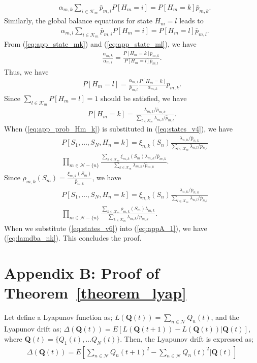 \documentclass[conference]{IEEEtran}
\newcommand{\Kset}{\mathcal{K}}
\newcommand{\Nset}{\mathcal{N}}
\begin{document}
\begin{align} \label{eq:app_state_mk}
& \alpha_{m,k} \sum_{i \in \Kset_{m}} \bar{p}_{m,i} P[H_m=i] = P[H_m=k] \bar{p}_{m,k}.  
\end{align} Similarly, the global balance equations for state $H_m=l$ leads to 
\begin{align} \label{eq:app_state_ml}
& \alpha_{m,l} \sum_{i \in \Kset_{m}} \bar{p}_{m,i} P[H_m=i] = P[H_m=l] \bar{p}_{m,l}.  
\end{align} From (\ref{eq:app_state_mk}) and (\ref{eq:app_state_ml}), we have 
\begin{align}
\frac{\alpha_{m,k}}{\alpha_{m,l}} = \frac{P[H_m=k]\bar{p}_{m,k}}{P[H_m=l]\bar{p}_{m,l}}.
\end{align} Thus, we have 
\begin{align}
P[H_m=l] = \frac{\alpha_{m,l}}{\bar{p}_{m,l}} \frac{P[H_m=k]}{\alpha_{m,k}} \bar{p}_{m,k}. 
\end{align} Since $\sum_{l \in \Kset_{m}} P[H_m = l] = 1$ should be satisfied, we have 
\begin{align} \label{eq:app_prob_Hm_k}
P[H_m = k] = \frac{\lambda_{m,k}/\bar{p}_{m,k}}{\sum_{l \in \Kset_{m}} \lambda_{m,l} / \bar{p}_{m,l}}. 
\end{align} When (\ref{eq:app_prob_Hm_k}) is substituted in (\ref{eq:states_v4}), we have 
\begin{align} \label{eq:states_v5}
& P[S_1,\ldots,S_N, H_n=k]  = \xi_{n,k}(S_n) \frac{\lambda_{n,k}/\bar{p}_{n,k}}{\sum_{l \in \Kset_{m}} \lambda_{n,l} / \bar{p}_{n,l}} \nonumber \\
& \prod_{m \in \Nset-\{n\}} \frac{\sum_{k \in \Kset_{m}} \xi_{m,k}(S_m)\lambda_{m,k}/\bar{p}_{m,k}}{\sum_{k \in \Kset_{m}} \lambda_{m,k}/\bar{p}_{m,k}}. 
\end{align} Since $\rho_{m,k}(S_m) = \frac{\xi_{m,k}(S_m)}{\bar{p}_{m,k}}$, we have 
\begin{align} \label{eq:states_v6}
& P[S_1,\ldots,S_N, H_n=k]  = \xi_{n,k}(S_n) \frac{\lambda_{n,k}/\bar{p}_{n,k}}{\sum_{l \in \Kset_{m}} \lambda_{n,l} / \bar{p}_{n,l}} \nonumber \\
& \prod_{m \in \Nset-\{n\}} \frac{\sum_{k \in \Kset_{m}} \rho_{m,k}(S_m)\lambda_{m,k}}{\sum_{k \in \Kset_{m}} \lambda_{m,k}/\bar{p}_{m,k}}. 
\end{align} When we substitute (\ref{eq:states_v6}) into (\ref{eq:appA_1}), we have (\ref{eq:lamdba_nk}). This concludes the proof. 



\section*{Appendix B: Proof of Theorem~\ref{theorem_lyap}}
Let define a Lyapunov function as; $L(\boldsymbol Q(t)) = \sum_{n \in \Nset} Q_{n}(t)$, and the Lyapunov drift as; $\Delta(\boldsymbol Q(t)) = E[L(\boldsymbol Q(t+1)) - L(\boldsymbol Q(t)) | \boldsymbol Q(t)]$, where $\boldsymbol Q(t) = \{Q_1(t), \ldots Q_{N}(t)\}$. Then, the Lyapunov drift is expressed as; 
\begin{align} \label{eq:appB_drift1}
\Delta(\boldsymbol Q(t)) = E[ \sum_{n \in \Nset} Q_{n}(t+1)^{2} - \sum_{n \in \Nset} Q_{n}(t)^2 | \boldsymbol Q(t)] 
\end{align}  
\end{document}

